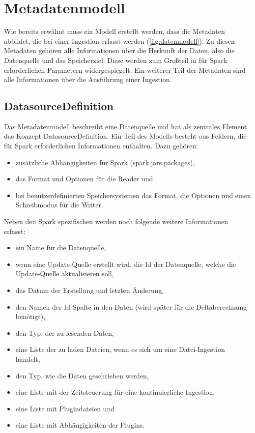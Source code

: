 \section{Metadatenmodell}

Wie bereits erwähnt muss ein Modell erstellt werden, dass die Metadaten abbildet, die bei einer Ingestion erfasst werden (\cref{fig:datenmodell}).
Zu diesen Metadaten gehören alle Informationen über die Herkunft der Daten, also die Datenquelle und das Speicherziel.
Diese werden zum Großteil in für Spark erforderlichen Parametern widergespiegelt.
Ein weiterer Teil der Metadaten sind alle Informationen über die Ausführung einer Ingestion.

\subsection{DatasourceDefinition}

Das Metadatenmodell beschreibt eine Datenquelle und hat als zentrales Element das Konzept DatasourceDefinition.
Ein Teil des Modells besteht aus Feldern, die für Spark erforderlichen Informationen enthalten.
Dazu gehören: \begin{itemize}
    \item zusätzliche Abhängigkeiten für Spark (spark.jars.packages),
    \item das Format und Optionen für die Reader und
    \item bei benutzerdefinierten Speichersystemen das Format, die Optionen und einen Schreibmodus für die Writer.
\end{itemize}
Neben den Spark spezifischen werden noch folgende weitere Informationen erfasst: \begin{itemize}
    \item ein Name für die Datenquelle,
    \item wenn eine Update-Quelle erstellt wird, die Id der Datenquelle, welche die Update-Quelle aktualisieren soll,
    \item das Datum der Erstellung und letzten Änderung,
    \item den Namen der Id-Spalte in den Daten (wird später für die Deltaberechnung benötigt),
    \item den Typ, der zu lesenden Daten,
    \item eine Liste der zu laden Dateien, wenn es sich um eine Datei-Ingestion handelt,
    \item den Typ, wie die Daten geschrieben werden,
    \item eine Liste mit der Zeitsteuerung für eine kontinuierliche Ingestion,
    \item eine Liste mit Plugindateien und
    \item eine Liste mit Abhängigkeiten der Plugins.
\end{itemize}

